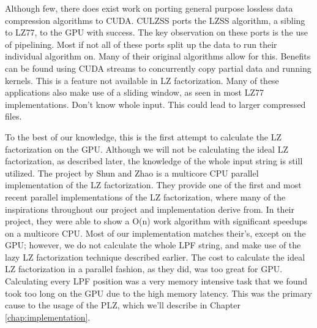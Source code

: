 Although few, there does exist work on porting general purpose lossless data compression algorithms to CUDA.
CULZSS ports the LZSS algorithm, a sibling to LZ77, to the GPU with success.
The key observation on these ports is the use of pipelining.
Most if not all of these ports split up the data to run their individual algorithm on.
Many of their original algorithms allow for this.
Benefits can be found using CUDA streams to concurrently copy partial data and running kernels.
This is a feature not available in LZ factorization.
Many of these applications also make use of a sliding window, as seen in most LZ77 implementations.
Don't know whole input.
This could lead to larger compressed files.


To the best of our knowledge, this is the first attempt to calculate the LZ factorization on the GPU.
Although we will not be calculating the ideal LZ factorization, as described later, the knowledge of the whole input string is still utilized.
The project by Shun and Zhao\cite{shun2013practical} is a multicore CPU parallel implementation of the LZ factorization.
They provide one of the first and most recent parallel implementations of the LZ factorization, where many of the inspirations throughout our project and implementation derive from.
In their project, they were able to show a O(n) work algorithm with significant speedups on a multicore CPU.
Most of our implementation matches their's, except on the GPU; however, we do not calculate the whole LPF string, and make use of the lazy LZ factorization technique described earlier.
The cost to calculate the ideal LZ factorization in a parallel fashion, as they did, was too great for GPU.
Calculating every LPF position was a very memory intensive task that we found took too long on the GPU due to the high memory latency.
This was the primary cause to the usage of the PLZ, which we'll describe in Chapter \ref{chap:implementation}.



